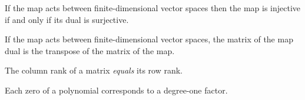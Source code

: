 \begin{multicols}{3}
  If the map acts between finite-dimensional vector spaces then the map is injective if and only if its dual is surjective.

  If the map acts between finite-dimensional vector spaces, the matrix of the map dual is the transpose of the matrix of the map.
  
  The column rank of a matrix \textit{equals} its row rank.

  Each zero of a polynomial corresponds to a degree-one factor.
  
  
  
\end{multicols}


